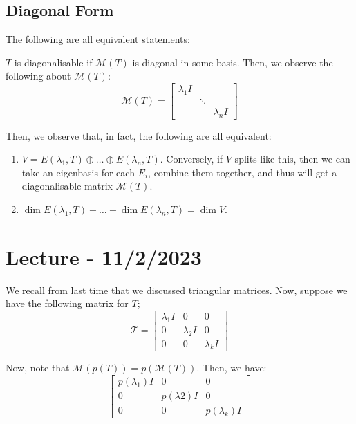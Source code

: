 \documentclass[openany]{book}
\begin{document}
\subsection{Diagonal Form}
The following are all equivalent statements:
\begin{thm}
	$T$ is diagonalisable if $\mathcal M(T)$ is diagonal in some basis. Then, we observe the following about $\mathcal{M}(T)$:
	\begin{equation*}
		\mathcal M(T) =
		\begin{bmatrix}
			\lambda_1 I & & \\ & \ddots & \\ & & \lambda_n I
		\end{bmatrix}
	\end{equation*}

	Then, we observe that, in fact, the following are all equivalent:
	\begin{enumerate}
		\item $V = E(\lambda_1, T) \oplus \ldots \oplus E(\lambda_n, T)$. Conversely, if $V$ splits like this, then we can take an eigenbasis for each $E_{i}$, combine them together, and thus will get a diagonalisable matrix $\mathcal M(T)$.
		
		\item $\dim E(\lambda_1, T) + \ldots + \dim E(\lambda_n, T) = \dim V$.
	\end{enumerate}
\end{thm}

\section{Lecture - 11/2/2023}
We recall from last time that we discussed triangular matrices. Now, suppose we have the following matrix for $T$;
\begin{equation*}
	\mathcal{ T} = \begin{bmatrix}
		\lambda_1 I & 0 & 0 \\ 0 & \lambda _{2} I & 0 \\ 0 & 0 & \lambda_k I
	\end{bmatrix}
\end{equation*}

Now, note that $\mathcal{M}(p(T)) = p(\mathcal{M}(T))$. Then, we have:
\begin{equation*}
	\begin{bmatrix}
		p(\lambda_1) I & 0 & 0 \\ 0 & p(\lambda 2) I & 0 \\ 0 & 0 & p(\lambda_k) I
	\end{bmatrix}
\end{equation*}
\end{document}
